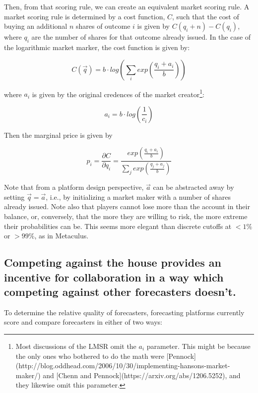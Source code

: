 \documentclass[]{article}
\begin{document}
Then, from that scoring rule, we can create an equivalent market scoring
rule. A market scoring rule is determined by a cost function, \(C\),
such that the cost of buying an additional \(n\) shares of outcome \(i\)
is given by \(C(q_i + n)-C(q_i)\), where \(q_i\) are the number of
shares for that outcome already issued. In the case of the logarithmic
market marker, the cost function is given by:

\[C(\vec{q}) = b \cdot log\left( \sum_i{exp\left(\frac{q_i + a_i}{b}\right)}\right)\]

where \(a_i\) is given by the original credences of the market
creator\footnote{Most discussions of the LMSR omit the $a_i$ parameter. This might be because the only ones who bothered to do the math were [Pennock](http://blog.oddhead.com/2006/10/30/implementing-hansons-market-maker/) and [Chenn and Pennock](https://arxiv.org/abs/1206.5252), and they likewise omit this parameter.}:

\[a_i = b \cdot log\left(\frac{1}{c_i}\right)\]

Then the marginal price is given by

\[p_i = \frac{\partial C}{\partial q_i} = \frac{exp\left(\frac{q_i + a_i}{b}\right)}{\sum_j{exp\left(\frac{q_j + a_j}{b}\right)}}\]

Note that from a platform design perspective, \(\vec{a}\) can be
abstracted away by setting \(\vec{q}=\vec{a}\), i.e., by initializing a
market maker with a number of shares already issued. Note also that
players cannot lose more than the account in their balance, or,
conversely, that the more they are willing to risk, the more extreme
their probabilities can be. This seems more elegant than discrete
cutoffs at \(<1\%\) or \(>99\%\), as in Metaculus.

\hypertarget{competing-against-the-house-provides-an-incentive-for-collaboration-in-a-way-which-competing-against-other-forecasters-doesnt.}{%
\subsection{Competing against the house provides an incentive for
collaboration in a way which competing against other forecasters
doesn't.}\label{competing-against-the-house-provides-an-incentive-for-collaboration-in-a-way-which-competing-against-other-forecasters-doesnt.}}

To determine the relative quality of forecasters, forecasting platforms
currently score and compare forecasters in either of two ways:
\end{document}
